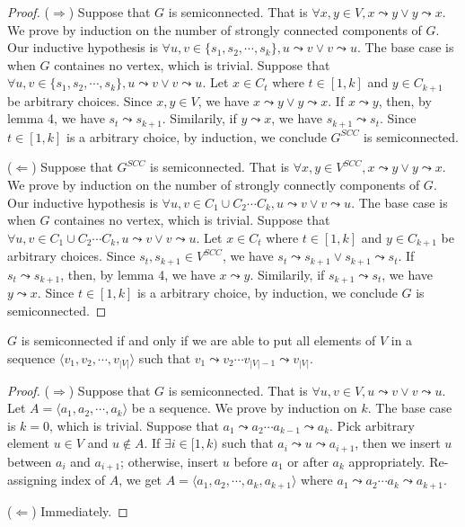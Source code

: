 \begin{proof}
    ($\Longrightarrow$)
    Suppose that $G$ is semiconnected.
    That is $\forall x,y \in V, x \leadsto y \vee y \leadsto x$.
    We prove by induction on the number of strongly connected components of $G$.
    Our inductive hypothesis is 
    $\forall u,v \in \{ s_1, s_2, \cdots, s_k \}, u \leadsto v \vee v \leadsto u$.
    The base case is when $G$ containes no vertex, which is trivial.
    Suppose that 
    $\forall u,v \in \{ s_1, s_2, \cdots, s_k \}, u \leadsto v \vee v \leadsto u$.
    Let $x \in C_t$ where $t \in [1,k]$ and $y \in C_{k+1}$ be arbitrary choices.
    Since $x,y \in V$, we have $x \leadsto y \vee y \leadsto x$.
    If $x \leadsto y$, then, by lemma 4, we have $s_t \leadsto s_{k+1}$.
    Similarily, if $y \leadsto x$, we have $s_{k+1} \leadsto s_t$.
    Since $t \in [1,k]$ is a arbitrary choice, by induction,
    we conclude $G^{SCC}$ is semiconnected.

    ($\Longleftarrow$)
    Suppose that $G^{SCC}$ is semiconnected.
    That is $\forall x,y \in V^{SCC}, x \leadsto y \vee y \leadsto x$.
    We prove by induction on the number of strongly connectly components of $G$.
    Our inductive hypothesis is 
    $\forall u,v \in C_1 \cup C_2 \cdots C_k, u \leadsto v \vee v \leadsto u$.
    The base case is when $G$ containes no vertex, which is trivial.
    Suppose that 
    $\forall u,v \in C_1 \cup C_2 \cdots C_k, u \leadsto v \vee v \leadsto u$.
    Let $x \in C_t$ where $t \in [1,k]$ and $y \in C_{k+1}$ be arbitrary choices.
    Since $s_t,s_{k+1} \in V^{SCC}$, we have 
    $s_t \leadsto s_{k+1} \vee s_{k+1} \leadsto s_t$.
    If $s_t \leadsto s_{k+1}$, then, by lemma 4, we have $x \leadsto y$.
    Similarily, if $s_{k+1} \leadsto s_t$, we have $y \leadsto x$.
    Since $t \in [1,k]$ is a arbitrary choice, by induction,
    we conclude $G$ is semiconnected.
\end{proof}

\begin{lemma}
    $G$ is semiconnected if and only if
    we are able to put all elements of $V$ in a sequence 
    $\langle v_1, v_2, \cdots, v_{|V|} \rangle$ such that 
    $v_1 \leadsto v_2 \cdots v_{|V|-1} \leadsto v_{|V|}$.
\end{lemma}

\begin{proof}
    ($\Longrightarrow$)
    Suppose that $G$ is semiconnected.
    That is $\forall u,v \in V, u \leadsto v \vee v \leadsto u$.
    Let $A = \langle a_1, a_2, \cdots, a_k \rangle$ be a sequence.
    We prove by induction on $k$.
    The base case is $k=0$, which is trivial.
    Suppose that
    $a_1 \leadsto a_2 \cdots a_{k-1} \leadsto a_k$.
    Pick arbitrary element $u \in V$ and $u \notin A$.
    If $\exists i \in [1,k)$ such that 
    $a_i \leadsto u \leadsto a_{i+1}$,
    then we insert $u$ between $a_i$ and $a_{i+1}$;
    otherwise, insert $u$ before $a_1$ or after $a_k$ appropriately.
    Re-assigning index of $A$,
    we get $A = \langle a_1, a_2, \cdots, a_k, a_{k+1} \rangle$
    where $a_1 \leadsto a_2 \cdots a_k \leadsto a_{k+1}$.

    ($\Longleftarrow$)
    Immediately.
\end{proof}

